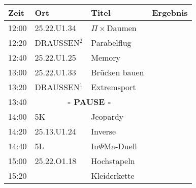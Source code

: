 \documentclass[a4paper,10pt]{article}
\def\spiela{25.22.U1.33 & Brücken bauen}
\def\spielb{DRAUSSEN$^1$ \footnotetext[1]{zwischen 25.22.U1 und 25.13.U1} & Extremsport}
\def\spielc{25.22.O1.18 & Hochstapeln}
\def\spield{5L & In$\Phi $Ma-Duell}
\def\spielee{ 25.13.U1.24 & Inverse}
\def\spielf{5K & Jeopardy}
\def\spielgg{25.22.U1.25 & Memory}
\def\spielh{DRAUSSEN$^2$ \footnotetext[2]{zwischen 25.22.U1 und 25.33.U1} & Parabelflug}
\def\spieli{ 25.22.U1.34 & $\Pi \times $Daumen}
\def\spielj{ & Kleiderkette}
\def\pause{\multicolumn{2}{|c|}{\textbf{- PAUSE -}}}
\begin{document}
  \LARGE
  \begin{center}
  \vspace{1cm}
  \begin{tabularx}{\textwidth}{p{2.5cm}||p{4.5cm}|p{6.5cm}|l}

  \textbf{Zeit}  & \textbf{Ort} 	&\textbf{Titel} 		& \textbf{Ergebnis} 	\\ \hline \hline

  12:00 &\spieli			&		\\ \hline
  12:20 &\spielh			&		\\ \hline
  12:40 &\spielgg			&		\\ \hline

  13:00 &\spiela		 	&		\\ \hline
  13:20 &\spielb			&		\\ \hline
  13:40 &\pause			&		\\ \hline

  14:00 &\spielf			&		\\ \hline
  14:20 &\spielee			&		\\ \hline
  14:40 &\spield			&		\\ \hline 

  15:00 &\spielc			&		\\ \hline \hline
  15:20 &\spielj			&

  \end{tabularx}
  \end{center}
\end{document}
